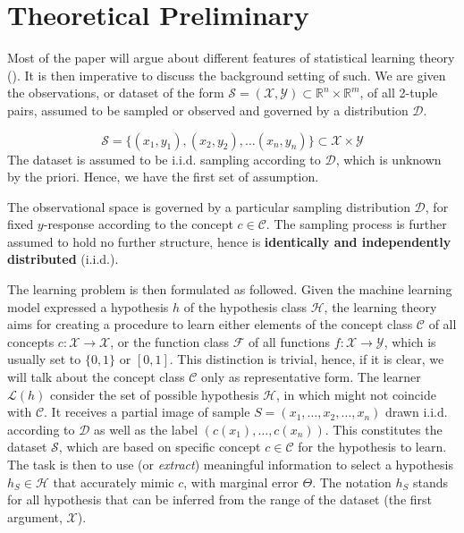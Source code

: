 \documentclass[twoside,10pt]{article}
\begin{document}
\section{Theoretical Preliminary}

Most of the paper will argue about different features of statistical learning theory (\cite{Sterkenburg_2024,Vapnik1999-VAPTNO,STL_Hajek_Maxim_2021}). It is then imperative to discuss the background setting of such. We are given the observations, or dataset of the form $\mathcal{S}=(\mathcal{X},\mathcal{Y})\subset \mathbb{R}^{n}\times \mathbb{R}^{m}$, of all 2-tuple pairs, assumed to be sampled or observed and governed by a distribution $\mathcal{D}$. 

\begin{equation*}
    \mathcal{S} = \{ (x_1,y_1), (x_2, y_2),\dots(x_n,y_n) \} \subset \mathcal{X}\times \mathcal{Y}
\end{equation*}
The dataset is assumed to be i.i.d. sampling according to $\mathcal{D}$, which is unknown by the priori. Hence, we have the first set of assumption. 
\begin{assumption}
The observational space is governed by a particular sampling distribution $\mathcal{D}$, for fixed $y$-response according to the concept $c\in \mathcal{C}$. The sampling process is further assumed to hold no further structure, hence is \textbf{identically and independently distributed} (i.i.d.). 
\end{assumption}
\vspace{2mm}

The learning problem is then formulated as followed. Given the machine learning model expressed a hypothesis $h$ of the hypothesis class $\mathcal{H}$, the learning theory aims for creating a procedure to learn either elements of the concept class $\mathcal{C}$ of all concepts $c: \mathcal{X}\to \mathcal{X}$, or the function class $\mathcal{F}$ of all functions $f: \mathcal{X}\to \mathcal{Y}$, which is usually set to $\{0,1\}$ or $[0,1]$. This distinction is trivial, hence, if it is clear, we will talk about the concept class $\mathcal{C}$ only as representative form. The learner $\mathcal{L}(h)$ consider the set of possible hypothesis $\mathcal{H}$, in which might not coincide with $\mathcal{C}$. It receives a partial image of sample $S=(x_{1},\dots,x_{2},\dots,x_n)$ drawn i.i.d. according to $\mathcal{D}$ as well as the label $(c(x_1),\dots,c(x_n))$. This constitutes the dataset $\mathcal{S}$, which are based on specific concept $c\in \mathcal{C}$ for the hypothesis to learn. The task is then to use (or \textit{extract}) meaningful information to select a hypothesis $h_{S}\in \mathcal{H}$ that accurately mimic $c$, with marginal error $\Theta$. The notation $h_{S}$ stands for all hypothesis that can be inferred from the range of the dataset (the first argument, $\mathcal{X}$). 
\end{document}
